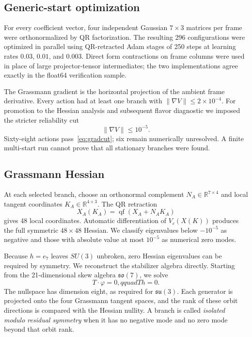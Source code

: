 \documentclass[11pt]{article}
\newcommand{\RR}{\mathbb R}
\begin{document}
\subsection{Generic-start optimization}

For every coefficient vector, four independent Gaussian $7\times3$ matrices per frame were orthonormalized by QR factorization.  The resulting 296 configurations were optimized in parallel using QR-retracted Adam stages of 250 steps at learning rates $0.03$, $0.01$, and $0.003$.  Direct form contractions on frame columns were used in place of large projector-tensor intermediates; the two implementations agree exactly in the float64 verification sample.

The Grassmann gradient is the horizontal projection of the ambient frame derivative.  Every action had at least one branch with $\lVert\nabla V\rVert\le2\times10^{-4}$.  For promotion to the Hessian analysis and subsequent flavor diagnostic we imposed the stricter reliability cut
\begin{equation}
  \lVert\nabla V\rVert\le10^{-5}.
  \label{eq:gradcut}
\end{equation}
Sixty-eight actions pass~\eqref{eq:gradcut}; six remain numerically unresolved.  A finite multi-start run cannot prove that all stationary branches were found.

\subsection{Grassmann Hessian}

At each selected branch, choose an orthonormal complement $N_A\in\RR^{7\times4}$ and local tangent coordinates $K_A\in\RR^{4\times3}$.  The QR retraction
\begin{equation}
  X_A(K_A)=\operatorname{qf}(X_A+N_AK_A)
\end{equation}
gives 48 local coordinates.  Automatic differentiation of $V_c(X(K))$ produces the full symmetric $48\times48$ Hessian.  We classify eigenvalues below $-10^{-5}$ as negative and those with absolute value at most $10^{-5}$ as numerical zero modes.

Because $h=e_7$ leaves $SU(3)$ unbroken, zero Hessian eigenvalues can be required by symmetry.  We reconstruct the stabilizer algebra directly.  Starting from the 21-dimensional skew algebra $\mathfrak{so}(7)$, we solve
\begin{equation}
  T\cdot\varphi=0,qquad Th=0.
\end{equation}
The nullspace has dimension eight, as required for $\mathfrak{su}(3)$.  Each generator is projected onto the four Grassmann tangent spaces, and the rank of these orbit directions is compared with the Hessian nullity.  A branch is called \emph{isolated modulo residual symmetry} when it has no negative mode and no zero mode beyond that orbit rank.
\end{document}
